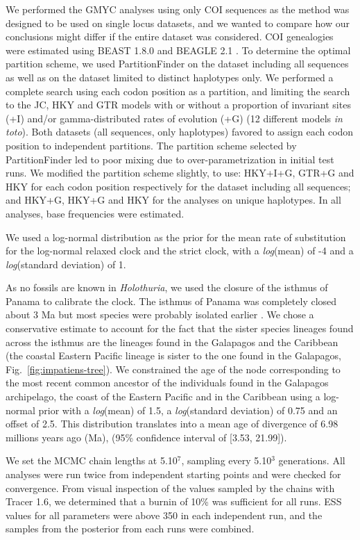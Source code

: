 \documentclass[12pt,letterpaper]{article}\usepackage[]{graphicx}\usepackage[]{color}
\begin{document}
We performed the GMYC analyses using only COI sequences as the method was
designed to be used on single locus datasets, and we wanted to compare how our
conclusions might differ if the entire dataset was considered. COI genealogies
were estimated using BEAST 1.8.0 \citep{Drummond2012} and BEAGLE 2.1
\citep{Ayres2012}. To determine the optimal partition scheme, we used
PartitionFinder \citep{Lanfear2012} on the dataset including all sequences as
well as on the dataset limited to distinct haplotypes only. We performed a
complete search using each codon position as a partition, and limiting the
search to the JC, HKY and GTR models with or without a proportion of invariant
sites (+I) and/or gamma-distributed rates of evolution (+G) (12 different models
\textit{in toto}). Both datasets (all sequences, only haplotypes) favored to
assign each codon position to independent partitions. The partition scheme
selected by PartitionFinder led to poor mixing due to over-parametrization in
initial test runs. We modified the partition scheme slightly, to use: HKY+I+G,
GTR+G and HKY for each codon position respectively for the dataset including all
sequences; and HKY+G, HKY+G and HKY for the analyses on unique haplotypes. In
all analyses, base frequencies were estimated.

We used a log-normal distribution as the prior for the mean rate of substitution
for the log-normal relaxed clock and the strict clock, with a \textit{log}(mean)
of -4 and a \textit{log}(standard deviation) of 1.

As no fossils are known in \textit{Holothuria}, we used the closure of the
isthmus of Panama to calibrate the clock. The isthmus of Panama was completely
closed about 3 Ma but most species were probably isolated earlier
\citep{Lessios2008}. We chose a conservative estimate to account for the fact
that the sister species lineages found across the isthmus are the lineages found
in the Galapagos and the Caribbean (the coastal Eastern Pacific lineage is
sister to the one found in the Galapagos, Fig.~\ref{fig:impatiens-tree}). We
constrained the age of the node corresponding to the most recent common ancestor
of the individuals found in the Galapagos archipelago, the coast of the Eastern
Pacific and in the Caribbean using a log-normal prior with a \textit{log}(mean)
of 1.5, a \textit{log}(standard deviation) of 0.75 and an offset of 2.5. This
distribution translates into a mean age of divergence of
6.98 millions years ago
(Ma), (95\% confidence interval of [3.53, 21.99]).

We set the MCMC chain lengths at 5.10$^{7}$, sampling every 5.10$^{3}$
generations. All analyses were run twice from independent starting points and
were checked for convergence. From visual inspection of the values sampled by
the chains with Tracer 1.6, we determined that a burnin of 10\% was sufficient
for all runs. ESS values for all parameters were above 350 in each independent
run, and the samples from the posterior from each runs were combined.
\end{document}
